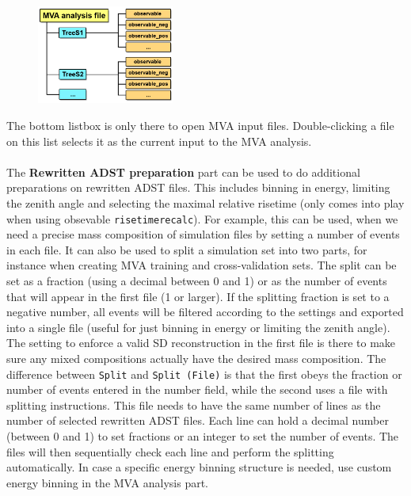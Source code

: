 \documentclass[12pt,a4paper]{report}
\begin{document}
\begin{figure}[H]
\centerline{\includegraphics[width=0.40\textwidth]{figures/file_structure.png}}
\end{figure}
{\noindent}The bottom listbox is only there to open MVA input files. Double-clicking a file on this list selects it as the current input to the MVA analysis.\\
\\
The \textbf{Rewritten ADST preparation} part can be used to do additional preparations on rewritten ADST files. This includes binning in energy, limiting the zenith angle and selecting the maximal relative risetime (only comes into play when using obsevable \texttt{risetimerecalc}). For example, this can be used, when we need a precise mass composition of simulation files by setting a number of events in each file. It can also be used to split a simulation set into two parts, for instance when creating MVA training and cross-validation sets. The split can be set as a fraction (using a decimal between 0 and 1) or as the number of events that will appear in the first file (1 or larger). If the splitting fraction is set to a negative number, all events will be filtered according to the settings and exported into a single file (useful for just binning in energy or limiting the zenith angle). The setting to enforce a valid SD reconstruction in the first file is there to make sure any mixed compositions actually have the desired mass composition. The difference between \texttt{Split} and \texttt{Split (File)} is that the first obeys the fraction or number of events entered in the number field, while the second uses a file with splitting instructions. This file needs to have the same number of lines as the number of selected rewritten ADST files. Each line can hold a decimal number (between 0 and 1) to set fractions or an integer to set the number of events. The files will then sequentially check each line and perform the splitting automatically. In case a specific energy binning structure is needed, use custom energy binning in the MVA analysis part.\\
\\
\end{document}
